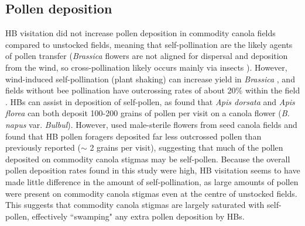 \documentclass[12pt]{article} %
\begin{document}
\subsection*{Pollen deposition}
HB visitation did not increase pollen deposition in commodity canola fields compared to unstocked fields, meaning that self-pollination are the likely agents of pollen transfer (\emph{Brassica} flowers are not aligned for dispersal and deposition from the wind, so cross-pollination likely occurs mainly via insects \citep{mesquida1982,cresswell2004}).
However, wind-induced self-pollination (plant shaking) can increase yield in \textit{Brassica} \citep{williams1986, mesquida1988c}, and fields without bee pollination have outcrossing rates of about 20\% within the field \citep{rakow1987,becker1992}.
HBs can assist in deposition of self-pollen, as \citet{ali2011} found that \textit{Apis dorsata} and \textit{Apis florea} can both deposit 100-200 grains of pollen per visit on a canola flower (\emph{B. napus} var. \emph{Bulbul}).
However, \citet{waytes2022} used male-sterile flowers from seed canola fields and found that HB pollen foragers deposited far less outcrossed pollen than previously reported ($\sim$ 2 grains per visit), suggesting that much of the pollen deposited on commodity canola stigmas may be self-pollen. 
Because the overall pollen deposition rates found in this study were high, HB visitation seems to have made little difference in the amount of self-pollination, as large amounts of pollen were present on commodity canola stigmas even at the centre of unstocked fields.
This suggests that commodity canola stigmas are largely saturated with self-pollen, effectively ``swamping" any extra pollen deposition by HBs.
\end{document}
